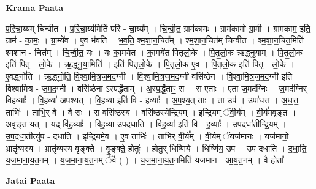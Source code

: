 \documentclass[17pt]{extarticle}
\begin{document}
\textbf{Krama Paata} \newline

प॒रि॒चा॒य्य॑म् चिन्वीत । प॒रि॒चा॒य्य॑मिति॑ परि - चा॒य्य᳚म् । चि॒न्वी॒त॒ ग्राम॑कामः । ग्राम॑कामो ग्रा॒मी । ग्राम॑काम॒ इति॒ ग्राम॑ - का॒मः॒ । ग्रा॒म्ये॑व । ए॒व भ॑वति । भ॒व॒ति॒ श्म॒शा॒न॒चित᳚म् । श्म॒शा॒न॒चित॑म् चिन्वीत । श्म॒शा॒न॒चित॒मिति॑ श्मशान - चित᳚म् । चि॒न्वी॒त॒ यः । यः का॒मये॑त । का॒मये॑त पितृलो॒के । पि॒तृ॒लो॒क ऋ॑द्ध्नुयाम् । पि॒तृ॒लो॒क इति॑ पितृ - लो॒के । ऋ॒द्ध्नु॒या॒मिति॑ । इति॑ पितृलो॒के । पि॒तृ॒लो॒क ए॒व । पि॒तृ॒लो॒क इति॑ पितृ - लो॒के । ए॒वर्द्ध्नो॑ति । ऋ॒द्ध्नो॒ति॒ वि॒श्वा॒मि॒त्र॒ज॒म॒द॒ग्नी । वि॒श्वा॒मि॒त्र॒ज॒म॒द॒ग्नी वसि॑ष्ठेन । वि॒श्वा॒मि॒त्र॒ज॒म॒द॒ग्नी इति॑ विश्वामित्र - ज॒म॒द॒ग्नी । वसि॑ष्ठेना ऽस्पर्द्धेताम् । अ॒स्प॒र्द्धे॒ताꣳ॒॒ स । स ए॒ताः । ए॒ता ज॒मद॑ग्निः । ज॒मद॑ग्निर् विह॒व्याः᳚ । वि॒ह॒व्या॑ अपश्यत् । वि॒ह॒व्या॑ इति॑ वि - ह॒व्याः᳚ । अ॒प॒श्य॒त् ताः । ता उप॑ । उपा॑धत्त । अ॒ध॒त्त॒ ताभिः॑ । ताभि॒र् वै । वै सः । स वसि॑ष्ठस्य । वसि॑ष्ठस्येन्द्रि॒यम् । इ॒न्द्रि॒यम् ॅवी॒र्य᳚म् । वी॒र्य॑मवृङ्त । अ॒वृ॒ङ्त॒ यत् । यद् वि॑ह॒व्याः᳚ । वि॒ह॒व्या॑ उप॒दधा॑ति । वि॒ह॒व्या॑ इति॑ वि - ह॒व्याः᳚ । उ॒प॒दधा॑तीन्द्रि॒यम् । उ॒प॒दधा॒तीत्यु॑प - दधा॑ति । इ॒न्द्रि॒यमे॒व । ए॒व ताभिः॑ । ताभि॑र् वी॒र्य᳚म् । वी॒र्य॑म् ॅयज॑मानः । यज॑मानो॒ भ्रातृ॑व्यस्य । भ्रातृ॑व्यस्य वृङ्क्ते । वृ॒ङ्क्ते॒ होतुः॑ । होतु॒र् धिष्णि॑ये । धिष्णि॑य॒ उप॑ । उप॑ दधाति । द॒धा॒ति॒ य॒ज॒मा॒ना॒य॒त॒नम् । य॒ज॒मा॒ना॒य॒त॒नम् ॅवै ( ) । य॒ज॒मा॒ना॒य॒त॒नमिति॑ यजमान - आ॒य॒त॒नम् । वै होता᳚ \newline

\textbf{Jatai Paata} \newline
\end{document}
